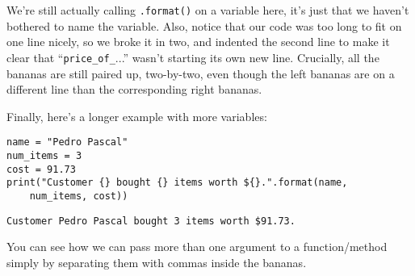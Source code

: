 We're still actually calling \texttt{.format()} on a variable here, it's just
that we haven't bothered to name the variable. Also, notice that our code was
too long to fit on one line nicely, so we broke it in two, and indented the
second line to make it clear that ``\texttt{price\_of\_}...'' wasn't
starting its own new
line. Crucially, all the bananas are still paired up, two-by-two, even though
the left bananas are on a different line than the corresponding right bananas.

\bigskip
Finally, here's a longer example with more variables:

\begin{Verbatim}[fontsize=\footnotesize,samepage=true,frame=single,framesep=3mm]
name = "Pedro Pascal"
num_items = 3
cost = 91.73
print("Customer {} bought {} items worth ${}.".format(name,
    num_items, cost))
\end{Verbatim}

\begin{Verbatim}[fontsize=\small,samepage=true,frame=leftline,framesep=5mm,framerule=1mm]
Customer Pedro Pascal bought 3 items worth $91.73.
\end{Verbatim}

You can see how we can pass more than one argument to a function/method simply
by separating them with commas inside the bananas.
